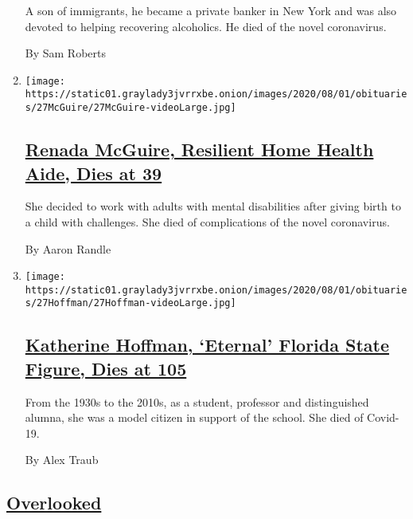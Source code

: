 \begin{enumerate}
  A son of immigrants, he became a private banker in New York and was
  also devoted to helping recovering alcoholics. He died of the novel
  coronavirus.

  By Sam Roberts
\item
  \texttt{[image: https://static01.graylady3jvrrxbe.onion/images/2020/08/01/obituaries/27McGuire/27McGuire-videoLarge.jpg]}

  \hypertarget{renada-mcguire-resilient-home-health-aide-dies-at-39}{%
  \subsection{\texorpdfstring{\href{/2020/07/29/obituaries/renada-mcguire-dead-coronavirus.html}{Renada
  McGuire, Resilient Home Health Aide, Dies at
  39}}{Renada McGuire, Resilient Home Health Aide, Dies at 39}}\label{renada-mcguire-resilient-home-health-aide-dies-at-39}}

  She decided to work with adults with mental disabilities after giving
  birth to a child with challenges. She died of complications of the
  novel coronavirus.

  By Aaron Randle
\item
  \texttt{[image: https://static01.graylady3jvrrxbe.onion/images/2020/08/01/obituaries/27Hoffman/27Hoffman-videoLarge.jpg]}

  \hypertarget{katherine-hoffman-eternal-florida-state-figure-dies-at-105}{%
  \subsection{\texorpdfstring{\href{/2020/07/29/obituaries/katherine-hoffman-dead-coronavirus.html}{Katherine
  Hoffman, `Eternal' Florida State Figure, Dies at
  105}}{Katherine Hoffman, `Eternal' Florida State Figure, Dies at 105}}\label{katherine-hoffman-eternal-florida-state-figure-dies-at-105}}

  From the 1930s to the 2010s, as a student, professor and distinguished
  alumna, she was a model citizen in support of the school. She died of
  Covid-19.

  By Alex Traub
\end{enumerate}

\hypertarget{overlooked}{%
\subsection{\texorpdfstring{\href{/spotlight/overlooked}{Overlooked}}{Overlooked}}\label{overlooked}}


